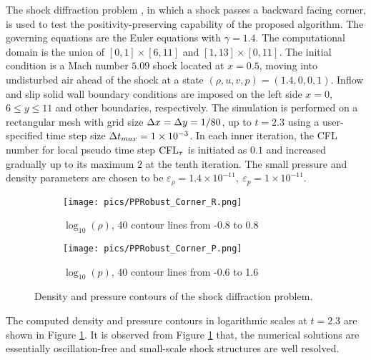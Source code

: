 The shock diffraction problem \cite{zhang2010positivity}, in which a shock passes a backward facing corner,
is used to test the positivity-preserving capability of the proposed algorithm.
The governing equations are the Euler equations with $\gamma = 1.4$.
The computational domain is the union of $[0,1]\times[6,11]$ and $[1,13]\times[0,11]$.
The initial condition is a Mach number $5.09$ shock located at $x=0.5$,
moving into undisturbed air ahead of the shock at a state $(\rho, u, v, p)=(1.4,0,0,1)$.
Inflow and slip solid wall boundary conditions are imposed on
the left side $x = 0$, $6\leq y \leq 11$ and other boundaries, respectively.
The simulation is performed on a rectangular mesh with grid size $\mathrm\Delta x = \mathrm\Delta y = 1/80$,
up to $t=2.3$ using a user-specified time step size $\mathrm\Delta t_{max}=1\times 10^{-3}$.
In each inner iteration, the CFL number for local pseudo time step $\text{CFL}_\tau$ is initiated as $0.1$
and increased gradually up to its maximum $2$ at the tenth iteration.
The small pressure and density parameters are chosen to be
$\varepsilon_\rho = 1.4\times10^{-11},\ \varepsilon_p = 1\times10^{-11}$.

\begin{figure}[htbp]
    \centering
    \begin{subfigure}{0.5\textwidth}
        \texttt{[image: pics/PPRobust\_Corner\_R.png]}
        \caption[]{$\log_{10}(\rho)$, 40 contour lines from -0.8 to 0.8}
    \end{subfigure}\hfill
    \begin{subfigure}{0.5\textwidth}
        \texttt{[image: pics/PPRobust\_Corner\_P.png]}
        \caption[]{$\log_{10}(p)$, 40 contour lines from -0.6 to 1.6}
    \end{subfigure}
    \caption{Density and pressure contours of the shock diffraction problem.}
    \label{fig:Corner}
\end{figure}

The computed density and pressure contours in logarithmic scales at $t=2.3$ are shown in Figure \ref{fig:Corner}.
It is observed from Figure \ref{fig:Corner} that,
the numerical solutions are essentially oscillation-free and small-scale shock structures are well resolved.


